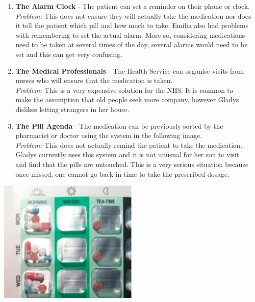 \documentclass{article}
\begin{document}
	\begin{enumerate}
	\item \textbf{The Alarm Clock} - The patient can set a reminder on their phone or clock. \\ \emph{Problem:} This does not ensure they will actually take the medication nor does it tell the patient which pill and how much to take. Emilia also had problems with remembering to set the actual alarm. More so, considering medications need to be taken at several times of the day, several alarms would need to be set and this can get very confusing.
	\item \textbf{The Medical Professionals} - The Health Service can organise visits from nurses who will ensure that the medication is taken. \\ \emph{Problem:} This is a very expensive solution for the NHS. It is common to make the assumption that old people seek more company, however Gladys dislikes letting strangers in her house.
	\item \textbf{The Pill Agenda} - The medication can be previously sorted by the pharmacist or doctor using the system in the following image. \\ \emph{Problem:} This does not actually remind the patient to take the medication. Gladys currently uses this system and it is not unusual for her son to visit and find that the pills are untouched. This is a very serious situation because once missed, one cannot go back in time to take the prescribed dosage.
	
	\end{enumerate}
\begin{center}\includegraphics[scale=0.5]{agenda.png}\end{center}
\end{document}
